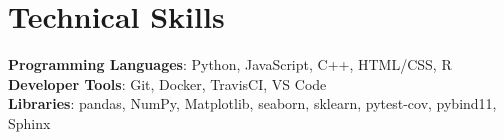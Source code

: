 \documentclass[letterpaper,11pt]{article}
\begin{document}
\section{Technical Skills}
  \begin{itemize}[leftmargin=0.15in, label={}]
    \small{\item{
      \textbf{Programming Languages}{: Python, JavaScript, C++, HTML/CSS, R} \\
      \textbf{Developer Tools}{: Git, Docker, TravisCI, VS Code} \\
      \textbf{Libraries}{: pandas, NumPy, Matplotlib, seaborn, sklearn, pytest-cov, pybind11, Sphinx}
    }}
  \end{itemize}
 



\end{document}
